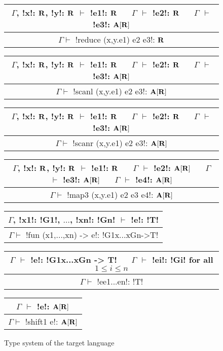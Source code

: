 \begin{figure*}[tb]
    \centering

    \begin{tabular}{c}
        $\Gamma$, !x!: $\mathbf{R}$, !y!: $\mathbf{R}$ $\vdash$ !e1!: $\mathbf{R}$ 
        $\quad$ $\Gamma$ $\vdash$ !e2!: $\mathbf{R}$
        $\quad$ $\Gamma$ $\vdash$ !e3!: $\mathbf{A}[\mathbf{R}]$
        \\\hline  
        $\Gamma \vdash$ !reduce (x,y.e1) e2 e3!: $\mathbf{R}$
    \end{tabular}

    \begin{tabular}{c}
        $\Gamma$, !x!: $\mathbf{R}$, !y!: $\mathbf{R}$ $\vdash$ !e1!: $\mathbf{R}$ 
        $\quad$ $\Gamma$ $\vdash$ !e2!: $\mathbf{R}$
        $\quad$ $\Gamma$ $\vdash$ !e3!: $\mathbf{A}[\mathbf{R}]$
        \\\hline  
        $\Gamma \vdash$ !scanl (x,y.e1) e2 e3!: $\mathbf{A}[\mathbf{R}]$
    \end{tabular}

    \begin{tabular}{c}
        $\Gamma$, !x!: $\mathbf{R}$, !y!: $\mathbf{R}$ $\vdash$ !e1!: $\mathbf{R}$ 
        $\quad$ $\Gamma$ $\vdash$ !e2!: $\mathbf{R}$
        $\quad$ $\Gamma$ $\vdash$ !e3!: $\mathbf{A}[\mathbf{R}]$
        \\\hline  
        $\Gamma \vdash$ !scanr (x,y.e1) e2 e3!: $\mathbf{A}[\mathbf{R}]$
    \end{tabular}

    \begin{tabular}{c}
        $\Gamma$, !x!: $\mathbf{R}$, !y!: $\mathbf{R}$ $\vdash$ !e1!: $\mathbf{R}$ 
        $\quad$ $\Gamma$ $\vdash$ !e2!: $\mathbf{A}[\mathbf{R}]$
        $\quad$ $\Gamma$ $\vdash$ !e3!: $\mathbf{A}[\mathbf{R}]$
        $\quad$ $\Gamma$ $\vdash$ !e4!: $\mathbf{A}[\mathbf{R}]$
        \\\hline  
        $\Gamma \vdash$ !map3 (x,y.e1) e2 e3 e4!: $\mathbf{A}[\mathbf{R}]$
    \end{tabular}

    \begin{tabular}{c}
        $\Gamma$, !x1!: !G1!, $\ldots$, !xn!: !Gn! $\vdash$ !e!: !T! 
        \\\hline  
        $\Gamma \vdash$ !fun (x1,...,xn) -> e!: !G1x...xGn->T!
    \end{tabular}

    \begin{tabular}{c}
        $\Gamma$ $\vdash$ !e!: !G1x...xGn -> T!
        $\quad$ $\Gamma$ $\vdash$ !ei!: !Gi! for all $1\leq i\leq n$
        \\\hline  
        $\Gamma \vdash$ !ee1...en!: !T!
    \end{tabular}

    \begin{tabular}{c}
        $\Gamma$ $\vdash$ !e!: $\mathbf{A}[\mathbf{R}]$
        \\\hline  
        $\Gamma \vdash$ !shift1 e!: $\mathbf{A}[\mathbf{R}]$
    \end{tabular}

    \vspace{-0.2cm}
    \caption{Type system of the target language}
    \vspace{-0.4cm}
    \label{fig:target_typesystem}
    \end{figure*}